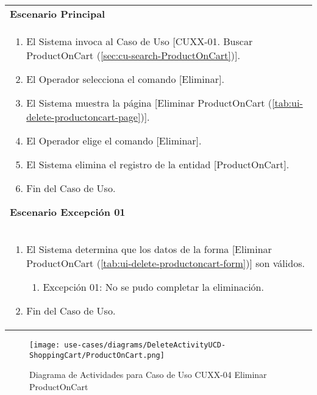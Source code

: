	\begin{tabular}{ p{15.5cm} }
		\textbf{Escenario Principal} \\
		\begin{enumerate}
			\item El Sistema invoca al Caso de Uso [CUXX-01. Buscar ProductOnCart (\ref{sec:cu-search-ProductOnCart})].
			\item El Operador selecciona el comando [Eliminar].
			\item El Sistema muestra la p\'agina [Eliminar ProductOnCart (\ref{tab:ui-delete-productoncart-page})].
			\item El Operador elige el comando [Eliminar].
			\item El Sistema elimina el registro de la entidad [ProductOnCart].
			\item Fin del Caso de Uso.
		\end{enumerate}
		\textbf{Escenario Excepci\'on 01} \\
		\begin{enumerate}
		   \item El Sistema determina que los datos de la forma [Eliminar ProductOnCart (\ref{tab:ui-delete-productoncart-form})] son v\'alidos.
		   	\begin{enumerate}
		   		\item Excepci\'on 01: No se pudo completar la eliminaci\'on.
		    \end{enumerate}
		   \item Fin del Caso de Uso.
		\end{enumerate}
	\end{tabular}
	
	\begin{figure}[H]
	  \begin{center}
		 \label{tab:activity-delete-ucd-entity-productoncart}
		 \texttt{[image: use-cases/diagrams/DeleteActivityUCD-ShoppingCart/ProductOnCart.png]}
		 \caption{Diagrama de Actividades para Caso de Uso CUXX-04 Eliminar ProductOnCart}
	  \end{center}
	\end{figure}
	
